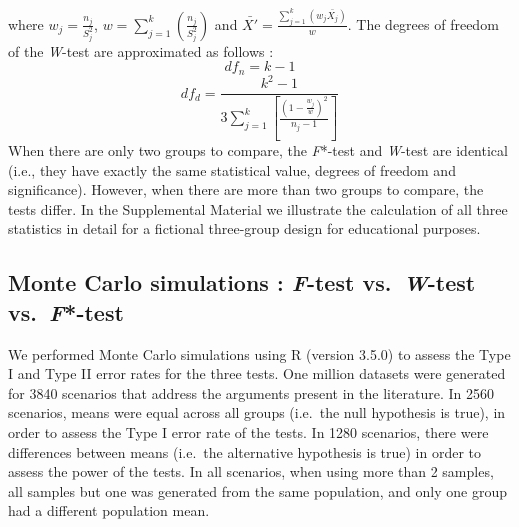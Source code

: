 \documentclass[
  english,
  man]{apa6}
\begin{document}
where \(w_j=\frac{n_j}{S_j^2}\), \(w=\sum_{j=1}^k(\frac{n_j}{S_j^2})\) and \(\bar{X'}=\frac{\sum_{j=1}^k(w_j\bar{X_j})}{w}\). The degrees of freedom of the \emph{W}-test are approximated as follows :
\begin{equation*} 
df_n= k-1
\label{eqn:WnumDF}
\end{equation*}
\begin{equation*}
df_d= \frac{k^2-1}{3\sum_{j=1}^k[\frac{(1-\frac{w_j}{w})^2}{n_j-1}]}
\label{eqn:WdenomDF}
\end{equation*}
When there are only two groups to compare, the \emph{F}*-test and \emph{W}-test are identical (i.e., they have exactly the same statistical value, degrees of freedom and significance). However, when there are more than two groups to compare, the tests differ. In the Supplemental Material we illustrate the calculation of all three statistics in detail for a fictional three-group design for educational purposes.

\hypertarget{monte-carlo-simulations-f-test-vs.-w-test-vs.-f-test}{%
\subsection{\texorpdfstring{Monte Carlo simulations : \emph{F}-test vs.~\emph{W}-test vs.~\emph{F}*-test}{Monte Carlo simulations : F-test vs.~W-test vs.~F*-test}}\label{monte-carlo-simulations-f-test-vs.-w-test-vs.-f-test}}

We performed Monte Carlo simulations using R (version 3.5.0) to assess the Type I and Type II error rates for the three tests. One million datasets were generated for 3840 scenarios that address the arguments present in the literature. In 2560 scenarios, means were equal across all groups (i.e.~the null hypothesis is true), in order to assess the Type I error rate of the tests. In 1280 scenarios, there were differences between means (i.e.~the alternative hypothesis is true) in order to assess the power of the tests. In all scenarios, when using more than 2 samples, all samples but one was generated from the same population, and only one group had a different population mean.
\end{document}
